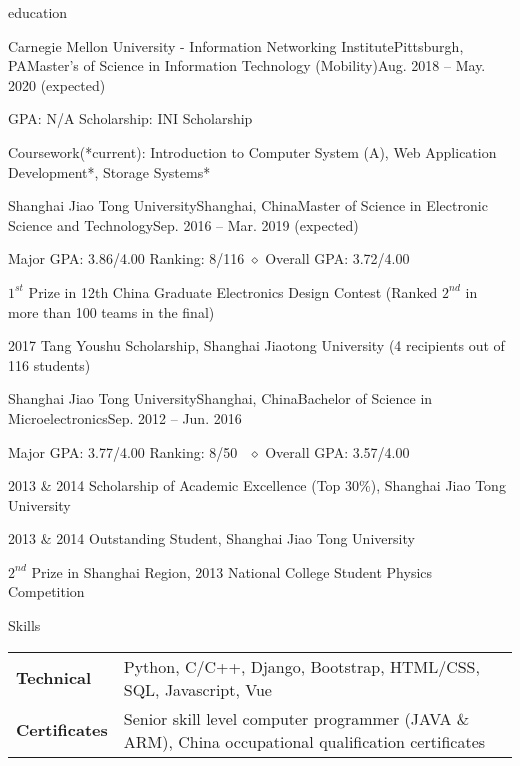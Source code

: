 \documentclass{resume_ucla} %
\begin{document}

\begin{rSection}{education}
\begin{rSubsection}{Carnegie Mellon University - Information Networking Institute}{Pittsburgh, PA}{Master's of Science in  Information Technology (Mobility)}{Aug. 2018 -- May. 2020 (expected)}
\item GPA: N/A \qquad Scholarship: INI Scholarship
\item Coursework(*current): Introduction to Computer System (A), Web Application Development*, Storage Systems*
\end{rSubsection}
\begin{rSubsection}{Shanghai Jiao Tong University}{Shanghai, China}{Master of Science in Electronic Science and Technology}{Sep. 2016 -- Mar. 2019 (expected)}
\item Major GPA: 3.86/4.00 \qquad Ranking: 8/116 \qquad $\diamond$ Overall GPA: 3.72/4.00
\item $1^{st}$ Prize in 12th China Graduate Electronics Design Contest (Ranked $2^{nd}$ in more than 100 teams in the final)
\item 2017 Tang Youshu Scholarship, Shanghai Jiaotong University (4 recipients out of 116 students)

\end{rSubsection}
\begin{rSubsection}{Shanghai Jiao Tong University}{Shanghai, China}{Bachelor of Science in Microelectronics}{Sep. 2012 -- Jun. 2016}
\item Major GPA: 3.77/4.00 \qquad Ranking: 8/50 \qquad \ $\diamond$ Overall GPA: 3.57/4.00
\item 2013 \& 2014 Scholarship of Academic Excellence (Top 30\%), Shanghai Jiao Tong University
\item 2013 \& 2014 Outstanding Student, Shanghai Jiao Tong University 
\item $2^{nd}$ Prize in Shanghai Region, 2013 National College Student Physics Competition
\end{rSubsection}

\end{rSection}

\begin{rSection}{Skills}
\begin{tabular}{ll}
\textbf{Technical \quad} & Python, C/C++, Django, Bootstrap, HTML/CSS, SQL, Javascript, Vue\\
\textbf{Certificates} & Senior skill level computer programmer (JAVA \& ARM), China occupational qualification certificates\\ 
\end{tabular}
\end{rSection}
\end{document}
